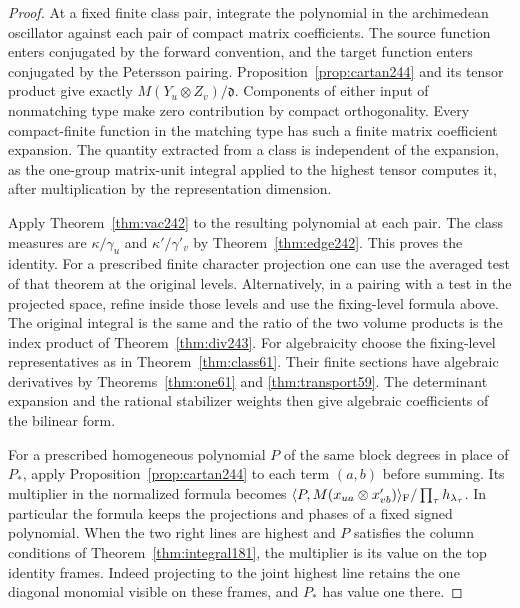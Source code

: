 \documentclass[a4paper,11pt]{article}
\theoremstyle{definition}
\theoremstyle{remark}
\numberwithin{equation}{section}
\begin{document}
\begin{proof}
At a fixed finite class pair, integrate the polynomial in the
archimedean oscillator against each pair of compact matrix
coefficients. The source function enters conjugated by the
forward convention, and the target function enters conjugated
by the Petersson pairing. Proposition~\ref{prop:cartan244}
and its tensor product give exactly
\(M(Y_u\otimes Z_v)/\mathfrak d\). Components of either input
of nonmatching type make zero contribution by compact
orthogonality. Every compact-finite function in the matching
type has such a finite matrix coefficient expansion. The
quantity extracted from a class is independent of the expansion,
as the one-group matrix-unit integral applied to the highest
tensor computes it, after multiplication by the representation
dimension.

Apply Theorem~\ref{thm:vac242} to the resulting polynomial at
each pair. The class measures are \(\kappa/\gamma_u\) and
\(\kappa'/\gamma'_v\) by Theorem~\ref{thm:edge242}. This proves
the identity. For a prescribed finite character projection one
can use the averaged test of that theorem at the original levels.
Alternatively, in a pairing with a test in the projected space,
refine inside those levels and use the fixing-level formula above.
The original integral is the same and the ratio of the two volume
products is the index product of Theorem~\ref{thm:div243}.
For algebraicity choose the fixing-level representatives as in
Theorem~\ref{thm:class61}. Their finite sections have algebraic
derivatives by Theorems~\ref{thm:one61} and \ref{thm:transport59}.
The determinant expansion and the rational stabilizer weights
then give algebraic coefficients of the bilinear form.

For a prescribed homogeneous polynomial \(P\) of the same block
degrees in place of \(P_*\), apply
Proposition~\ref{prop:cartan244} to each term \((a,b)\) before
summing. Its multiplier in the normalized formula becomes
\(\langle P,M(x_{ua}\otimes x'_{vb})\rangle_{\rm F}/
\prod_\tau h_{\lambda_\tau}\). In particular the formula keeps
the projections and phases of a fixed signed polynomial. When
the two right lines are highest and \(P\) satisfies the column
conditions of Theorem~\ref{thm:integral181}, the multiplier is
its value on the top identity frames. Indeed projecting to the
joint highest line retains the one diagonal monomial visible on
these frames, and \(P_*\) has value one there.
\end{proof}
\end{document}
